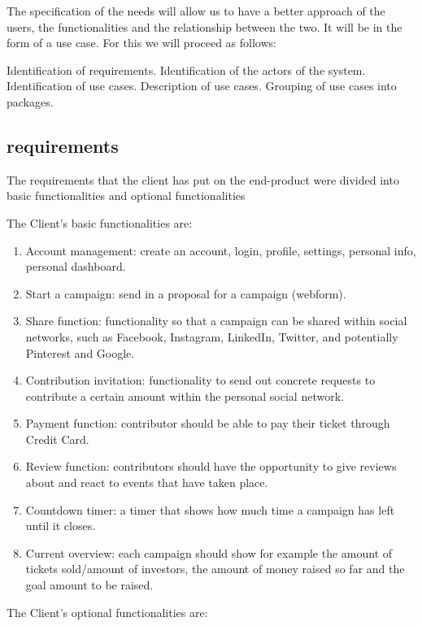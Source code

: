 The specification of the needs will allow us to have a better approach of the users, the functionalities and the relationship between the two. It will be in the form of a use case. For this we will proceed as follows:

Identification of requirements.
Identification of the actors of the system.
Identification of use cases.
Description of use cases.
Grouping of use cases into packages.


\subsection{requirements}
The requirements that the client has put on the end-product were divided into basic functionalities and optional functionalities

The Client’s basic functionalities are:
\begin{enumerate}
    \item
          Account management: create an account, login, profile, settings, personal info,
          personal dashboard.
    \item
          Start a campaign: send in a proposal for a campaign (webform).
    \item
          Share function: functionality so that a campaign can be shared within social networks, such as Facebook, Instagram, LinkedIn, Twitter, and potentially Pinterest and Google.
    \item
          Contribution invitation: functionality to send out concrete requests to contribute a certain amount
          within the personal social network.
    \item
          Payment function: contributor should be able to pay their ticket through Credit Card.
    \item
          Review function: contributors should have the opportunity to give reviews about and react to events
          that have taken place.
    \item
          Countdown timer: a timer that shows how much time a campaign has left until it closes.
    \item
          Current overview: each campaign should show for example the amount of tickets sold/amount of investors, the amount of money raised so far and the goal amount to be raised.
\end{enumerate}


The Client’s optional functionalities are:

